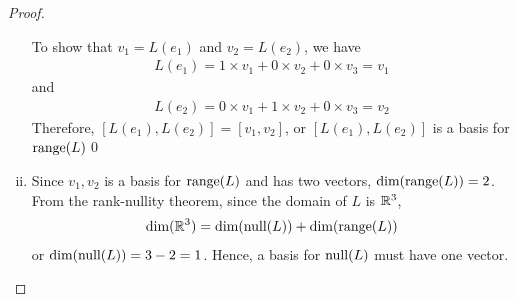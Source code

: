 \begin{proof}
\begin{enumerate}[(i)]
        To show that $v_1=L(e_1)$ and $v_2=L(e_2)$, we have 
        \[
            \begin{aligned}
                L(e_1)=1\times v_1+0\times v_2+0\times v_3=v_1
            \end{aligned}
        \]
        and 
        \[
            \begin{aligned}
                L(e_2)=0\times v_1+1\times v_2+0\times v_3=v_2
            \end{aligned}
        \]
        Therefore, $[L(e_1),L(e_2)]=[v_1,v_2]$, or $[L(e_1),L(e_2)]$ is a basis for $\textnormal{range}(L)$\qed
        \item 
        Since $v_1,v_2$ is a basis for $\textnormal{range}(L)$ and has two vectors, $\textnormal{dim}(\textnormal{range}(L))=2$.
        From the rank-nullity theorem, since the domain of $L$ is $\mathbb R^3$, 
        \[
            \begin{aligned}
                \textnormal{dim}(\mathbb R^3)=\textnormal{dim}(\textnormal{null}(L))+\textnormal{dim}(\textnormal{range}(L))
            \end{aligned}
        \]
        or $\textnormal{dim}(\textnormal{null}(L))=3-2=1$. Hence, a basis for $\textnormal{null}(L)$ must have one vector.


\end{enumerate}
\end{proof}
